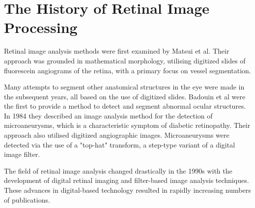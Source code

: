 \section{The History of Retinal Image Processing}


Retinal image analysis methods were first examined by Matsui et al.  Their approach was grounded in mathematical morphology, utilising digitized slides of fluorescein angiograms of the retina, with a primary focus on vessel segmentation.\cite{matsui1973study}

Many attempts to segment other anatomical structures in the eye were made in the subsequent years, all based on the use of digitized slides.  Badouin et al were the first to provide a method to detect and segment abnormal ocular structures.  In 1984 they described an image analysis method for the detection of microaneurysms, which is a characteristic symptom of diabetic retinopathy.\cite{baudoin1983automatic}  Their approach also utilised digitized angiographic images.  Microaneurysms were detected via the use of a "top-hat" transform, a step-type variant of a digital image filter.\cite{sonka1998image}

The field of retinal image analysis changed drastically in the 1990s with the development of digital retinal imaging and filter-based image analysis techniques.  These advances in digital-based technology resulted in rapidly increasing numbers of publications.
